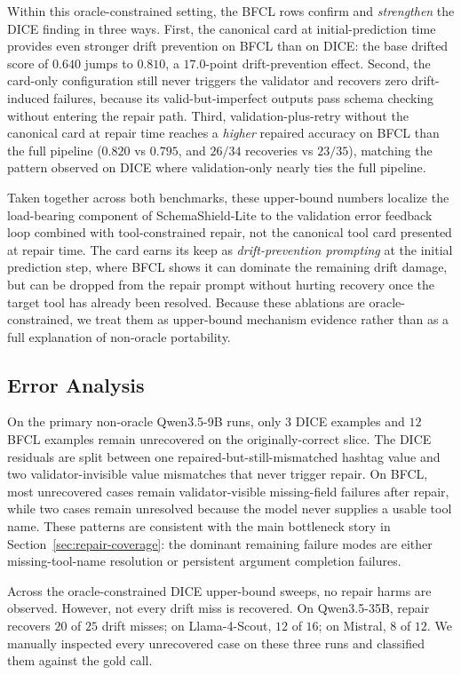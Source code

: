 \documentclass[runningheads]{llncs}
\newcommand{\method}{SchemaShield-Lite\xspace}
\begin{document}
Within this oracle-constrained setting, the BFCL rows confirm and \emph{strengthen}
the DICE finding in three ways.
First, the canonical card at initial-prediction time provides even stronger
drift prevention on BFCL than on DICE: the base drifted score of $0.640$ jumps
to $0.810$, a $17.0$-point drift-prevention effect. Second, the card-only
configuration still never triggers the validator and recovers zero
drift-induced failures, because its valid-but-imperfect outputs pass schema
checking without entering the repair path. Third, validation-plus-retry
without the canonical card at repair time reaches a \emph{higher} repaired
accuracy on BFCL than the full pipeline ($0.820$ vs $0.795$, and $26/34$
recoveries vs $23/35$), matching the pattern observed on DICE where
validation-only nearly ties the full pipeline.

Taken together across both benchmarks, these upper-bound numbers localize the
load-bearing component of \method to the validation error feedback loop
combined with tool-constrained repair, not the canonical tool card presented at
repair time. The card earns its keep as \emph{drift-prevention prompting}
at the initial prediction step, where BFCL shows it can dominate the
remaining drift damage, but can be dropped from the repair prompt without
hurting recovery once the target tool has already been resolved. Because these
ablations are oracle-constrained, we treat them as upper-bound mechanism evidence
rather than as a full explanation of non-oracle portability.

\subsection{Error Analysis}
\label{sec:error-analysis}
On the primary non-oracle Qwen3.5-9B runs, only $3$ DICE examples and $12$ BFCL
examples remain unrecovered on the originally-correct slice. The DICE residuals are
split between one repaired-but-still-mismatched hashtag value and two
validator-invisible value mismatches that never trigger repair. On BFCL, most
unrecovered cases remain validator-visible missing-field failures after repair,
while two cases remain unresolved because the model never supplies a usable tool
name. These patterns are consistent with the main bottleneck story in
Section~\ref{sec:repair-coverage}: the dominant remaining failure modes are either
missing-tool-name resolution or persistent argument completion failures.

Across the oracle-constrained DICE upper-bound sweeps, no repair harms are observed.
However, not every drift miss is recovered. On Qwen3.5-35B, repair recovers $20$ of
$25$ drift misses; on Llama-4-Scout, $12$ of $16$; on Mistral, $8$ of $12$. We
manually inspected every unrecovered case on these three runs and classified them
against the gold call.
\end{document}
